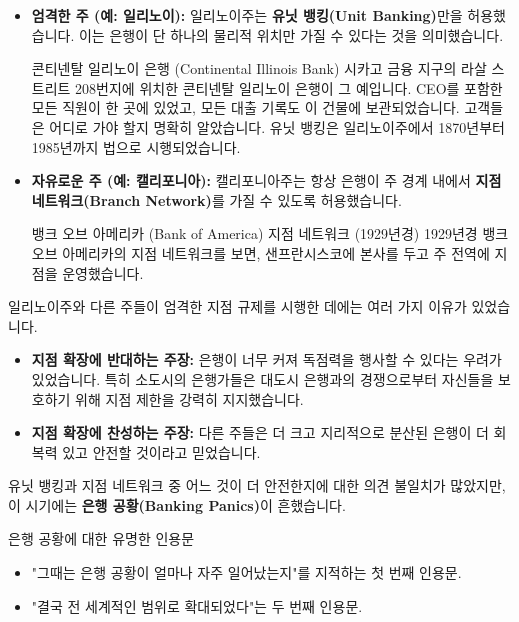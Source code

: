 \documentclass[11pt,a4paper]{article}
\theoremstyle{definition}
\begin{document}
\begin{itemize}
    \item \textbf{엄격한 주 (예: 일리노이):} 일리노이주는 \textbf{유닛 뱅킹(Unit Banking)}만을 허용했습니다. 이는 은행이 단 하나의 물리적 위치만 가질 수 있다는 것을 의미했습니다.
    \begin{examplebox}{콘티넨탈 일리노이 은행 (Continental Illinois Bank)}
    시카고 금융 지구의 라살 스트리트 208번지에 위치한 콘티넨탈 일리노이 은행이 그 예입니다. CEO를 포함한 모든 직원이 한 곳에 있었고, 모든 대출 기록도 이 건물에 보관되었습니다. 고객들은 어디로 가야 할지 명확히 알았습니다. 유닛 뱅킹은 일리노이주에서 1870년부터 1985년까지 법으로 시행되었습니다.
    \end{examplebox}
    \item \textbf{자유로운 주 (예: 캘리포니아):} 캘리포니아주는 항상 은행이 주 경계 내에서 \textbf{지점 네트워크(Branch Network)}를 가질 수 있도록 허용했습니다.
    \begin{examplebox}{뱅크 오브 아메리카 (Bank of America) 지점 네트워크 (1929년경)}
    1929년경 뱅크 오브 아메리카의 지점 네트워크를 보면, 샌프란시스코에 본사를 두고 주 전역에 지점을 운영했습니다.
    \end{examplebox}
\end{itemize}

일리노이주와 다른 주들이 엄격한 지점 규제를 시행한 데에는 여러 가지 이유가 있었습니다.
\begin{itemize}
    \item \textbf{지점 확장에 반대하는 주장:} 은행이 너무 커져 독점력을 행사할 수 있다는 우려가 있었습니다. 특히 소도시의 은행가들은 대도시 은행과의 경쟁으로부터 자신들을 보호하기 위해 지점 제한을 강력히 지지했습니다.
    \item \textbf{지점 확장에 찬성하는 주장:} 다른 주들은 더 크고 지리적으로 분산된 은행이 더 회복력 있고 안전할 것이라고 믿었습니다.
\end{itemize}
유닛 뱅킹과 지점 네트워크 중 어느 것이 더 안전한지에 대한 의견 불일치가 많았지만, 이 시기에는 \textbf{은행 공황(Banking Panics)}이 흔했습니다.

\begin{examplebox}{은행 공황에 대한 유명한 인용문}
\begin{itemize}
    \item "그때는 은행 공황이 얼마나 자주 일어났는지"를 지적하는 첫 번째 인용문.
    \item "결국 전 세계적인 범위로 확대되었다"는 두 번째 인용문.
\end{itemize}
\end{examplebox}
\end{document}

